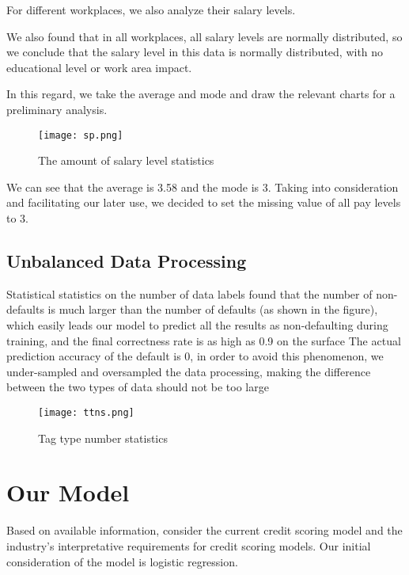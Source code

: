 \documentclass{mcmthesis}
\begin{document}
For different workplaces, we also analyze their salary levels.

We also found that in all workplaces, all salary levels are normally distributed, so we conclude that the salary level in this data is normally distributed, with no educational level or work area impact.

In this regard, we take the average and mode and draw the relevant charts for a preliminary analysis.

\begin{figure}[h]
\small
\centering
\texttt{[image: sp.png]}
\caption{The amount of salary level statistics} \label{fig:The amount of salary level statistics}
\end{figure}

We can see that the average is 3.58 and the mode is 3. Taking into consideration and facilitating our later use, we decided to set the missing value of all pay levels to 3.

\subsection{Unbalanced Data Processing}
Statistical statistics on the number of data labels found that the number of non-defaults is much larger than the number of defaults (as shown in the figure), which easily leads our model to predict all the results as non-defaulting during training, and the final correctness rate is as high as 0.9 on the surface The actual prediction accuracy of the default is 0, in order to avoid this phenomenon, we under-sampled and oversampled the data processing, making the difference between the two types of data should not be too large
\newline
\begin{figure}[h]
\small
\centering
\texttt{[image: ttns.png]}
\caption{Tag type number statistics} \label{fig:Tag type number statistics}
\end{figure}

\section{Our Model}
Based on available information, consider the current credit scoring model and the industry's interpretative requirements for credit scoring models. Our initial consideration of the model is logistic regression.
\end{document}
